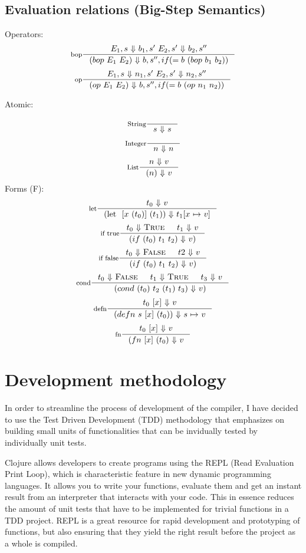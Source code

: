 \subsection{Evaluation relations (Big-Step Semantics)}
Operators:
\[
\inference[bop]{E_1, s \ $$\Downarrow$$ \ b_1, s' \ E_2, s' \ $$\Downarrow$$ \ b_2, s''}
{(bop \ E_1 \ E_2) \ $$\Downarrow$$ \ b, s'', if (= b \ (bop \ b_1 \ b_2))}
\]
\[
\inference[op]{E_1, s \ $$\Downarrow$$ \ n_1, s' \ E_2, s' \ $$\Downarrow$$ \ n_2, s''}
{(op \ E_1 \ E_2) \ $$\Downarrow$$ \ b, s'', if (= b \ (op \ n_1 \ n_2))}
\]


Atomic:

\[
\inference[String]{}
{s \ $$\Downarrow$$ \ s}
\]
\[
\inference[Integer]{}
{n \ $$\Downarrow$$ \ n}
\]
\[
\inference[List]{n \ $$\Downarrow$$ \ v}
{(n) \ $$\Downarrow$$ \ v}
\]
Forms (F):
\[
\inference[let]{t_0 \ $$\Downarrow$$ \ v}
{(\text{let } \ {[x \ (t_0)]} \ (t_1)) \ $$\Downarrow$$ \ t_1 {[}x \ $$\mapsto$$ \ v{]} }
\]
\[
\inference[if true]{{t_0} \ $$\Downarrow$$ \ \textsc{True} & t_1 \ $$\Downarrow$$ \ v}
{(if \ (t_0) \ t_1 \ t_2) \ $$\Downarrow$$ \ v) }
\]
\[
\inference[if false]{t_0 \ $$\Downarrow$$ \ \textsc{False} & t2 \ $$\Downarrow$$ \ v}
{(if \ (t_0) \ t_1 \ t_2) \ $$\Downarrow$$ \ v) }
\]
\[
\inference[cond]{t_0 \ $$\Downarrow$$ \ \textsc{False} & t_1 \ $$\Downarrow$$ \ \textsc{True} & t_3 \ $$\Downarrow$$ \ v}
{(cond \ (t_0) \ t_2 \ (t_1) \ t_3) \ $$\Downarrow$$ \ v) }
\]
\[
\inference[defn]{ {t_0 \ [x]} \ $$\Downarrow$$ \ v}
{(defn \ s \ {[x]} \ (t_0)) \ $$\Downarrow$$ \ s \ $$\mapsto$$ \ v }
\]
\[
\inference[fn]{ {t_0 \ [x]} \ $$\Downarrow$$ \ v}
{(fn \ {[x]}  \ (t_0) \ $$\Downarrow$$ \ v }
\]

\section{Development methodology}
In order to streamline the process of development of the compiler, I have decided to use the Test Driven Development (TDD) methodology that emphasizes on building small units of functionalities that can be invidually tested by individually unit tests. 

Clojure allows developers to create programs using the REPL (Read Evaluation Print Loop), which is characteristic feature in new dynamic programming languages. It allows you to write your functions, evaluate them and get an instant result from an interpreter that interacts with your code. This in essence reduces the amount of unit tests that have to be implemented for trivial functions in a TDD project. 
REPL is a great resource for rapid development and prototyping of functions, but also ensuring that they yield the right result before the project as a whole is compiled.

